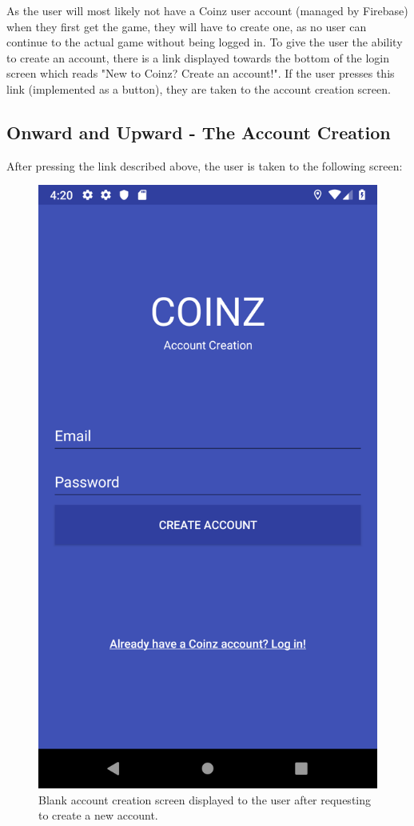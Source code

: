 \documentclass[11pt,a4paper,notitlepage]{article}
\begin{document}
    As the user will most likely not have a Coinz user account (managed by Firebase) when they first get the game, they will have to create one, as no user can continue to the actual game without being logged in. To give the user the ability to create an account, there is a link displayed towards the bottom of the login screen which reads "New to Coinz? Create an account!". If the user presses this link (implemented as a button), they are taken to the account creation screen.

\subsection{Onward and Upward - The Account Creation}

    After pressing the link described above, the user is taken to the following screen:

\begin{figure}[H]
    \centering
    \includegraphics[scale=0.25]{screenshots/account-creation/create-account-screen.png}
    \caption{Blank account creation screen displayed to the user after requesting to create a new account.}
\end{figure}
\end{document}
